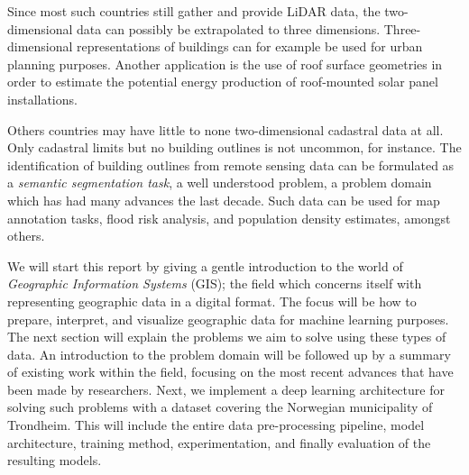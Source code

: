 Since most such countries still gather and provide LiDAR data, the two-dimensional data can possibly be extrapolated to three dimensions.
Three-dimensional representations of buildings can for example be used for urban planning purposes.
Another application is the use of roof surface geometries in order to estimate the potential energy production of roof-mounted solar panel installations.

Others countries may have little to none two-dimensional cadastral data at all.
Only cadastral limits but no building outlines is not uncommon, for instance.
The identification of building outlines from remote sensing data can be formulated as a \textit{semantic segmentation task}, a well understood problem, a problem domain which has had many advances the last decade.
Such data can be used for map annotation tasks, flood risk analysis, and population density estimates, amongst others.

We will start this report by giving a gentle introduction to the world of \textit{Geographic Information Systems} (GIS); the field which concerns itself with representing geographic data in a digital format.
The focus will be how to prepare, interpret, and visualize geographic data for machine learning purposes.
The next section will explain the problems we aim to solve using these types of data.
An introduction to the problem domain will be followed up by a summary of existing work within the field, focusing on the most recent advances that have been made by researchers.
Next, we implement a deep learning architecture for solving such problems with a dataset covering the Norwegian municipality of Trondheim.
This will include the entire data pre-processing pipeline, model architecture, training method, experimentation, and finally evaluation of the resulting models.

